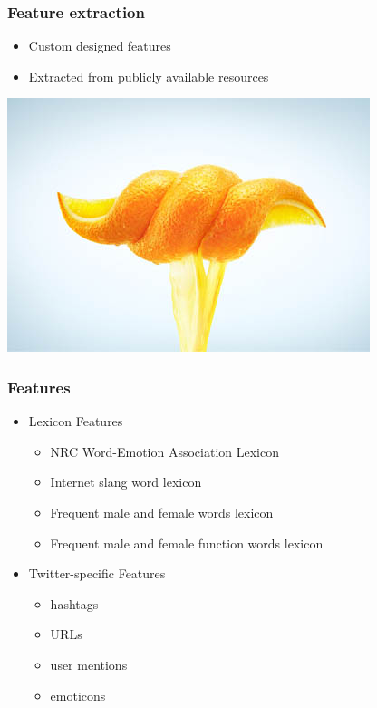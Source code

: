 \documentclass[slidestop,compress,11pt,xcolor=dvipsnames]{beamer}
\begin{document}
\begin{frame}
\frametitle{Feature extraction}
\begin{itemize}
	\item Custom designed features
	\item Extracted from publicly available resources
\end{itemize}
	\vspace{4mm}
	\centerline{\includegraphics[scale=0.5]{orange}}
\end{frame}


\begin{frame}
\frametitle{Features}
\begin{itemize}
	\setlength\itemsep{2mm}
	\item Lexicon Features
	\begin{itemize}
		\item NRC Word-Emotion Association Lexicon
		\item Internet slang word lexicon
		\item Frequent male and female words lexicon
		\item Frequent male and female function words lexicon
	\end{itemize}
	\item Twitter-specific Features
	\begin{itemize}
		\item hashtags
		\item URLs
		\item user mentions
		\item emoticons
	\end{itemize}
\end{itemize}
	
\end{frame}
\end{document}
